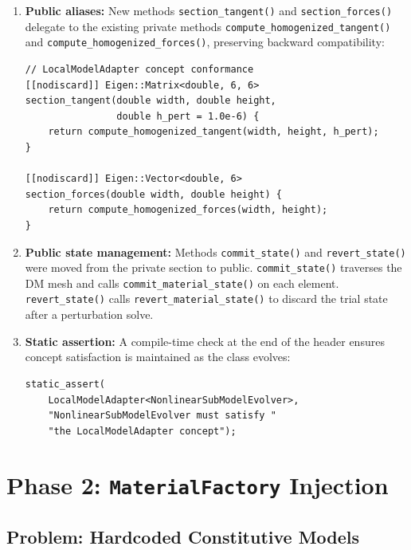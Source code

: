 \begin{enumerate}
  \item \textbf{Public aliases:} New methods \texttt{section\_tangent()}
    and \texttt{section\_forces()} delegate to the existing private
    methods \texttt{compute\_homogenized\_tangent()} and
    \texttt{compute\_homogenized\_forces()}, preserving backward
    compatibility:
\begin{lstlisting}[caption={Public aliases on the evolver.},
                   label={lst:evolver-aliases}]
// LocalModelAdapter concept conformance
[[nodiscard]] Eigen::Matrix<double, 6, 6>
section_tangent(double width, double height,
                double h_pert = 1.0e-6) {
    return compute_homogenized_tangent(width, height, h_pert);
}

[[nodiscard]] Eigen::Vector<double, 6>
section_forces(double width, double height) {
    return compute_homogenized_forces(width, height);
}
\end{lstlisting}

  \item \textbf{Public state management:} Methods
    \texttt{commit\_state()} and \texttt{revert\_state()} were moved
    from the private section to public.  \texttt{commit\_state()}
    traverses the DM mesh and calls \texttt{commit\_material\_state()}
    on each element.  \texttt{revert\_state()} calls
    \texttt{revert\_material\_state()} to discard the trial state
    after a perturbation solve.

  \item \textbf{Static assertion:} A compile-time check at the end
    of the header ensures concept satisfaction is maintained as the
    class evolves:
\begin{lstlisting}[caption={Compile-time concept check.}]
static_assert(
    LocalModelAdapter<NonlinearSubModelEvolver>,
    "NonlinearSubModelEvolver must satisfy "
    "the LocalModelAdapter concept");
\end{lstlisting}
\end{enumerate}


\section{Phase 2: \texttt{MaterialFactory} Injection}
\label{sec:refactor-material-factory}

\subsection{Problem: Hardcoded Constitutive Models}

